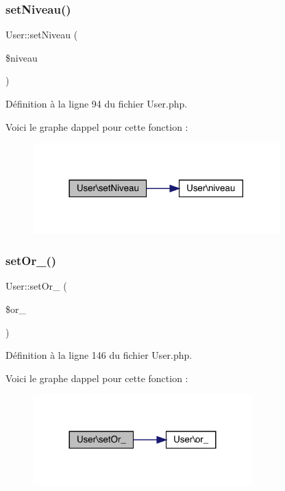 \subsubsection{\texorpdfstring{set\+Niveau()}{setNiveau()}}
{\footnotesize\ttfamily User\+::set\+Niveau (\begin{DoxyParamCaption}\item[{}]{\$niveau }\end{DoxyParamCaption})}



Définition à la ligne 94 du fichier User.\+php.

Voici le graphe d\textquotesingle{}appel pour cette fonction \+:\nopagebreak
\begin{figure}[H]
\begin{center}
\leavevmode
\includegraphics[width=270pt]{class_user_a84973efb146fe894e77bee5fe3b08f75_cgraph}
\end{center}
\end{figure}
\mbox{\label{class_user_ac5dfa43083d232944fa37624d190092e}} 
\subsubsection{\texorpdfstring{set\+Or\+\_\+()}{setOr\_()}}
{\footnotesize\ttfamily User\+::set\+Or\+\_\+ (\begin{DoxyParamCaption}\item[{}]{\$or\+\_\+ }\end{DoxyParamCaption})}



Définition à la ligne 146 du fichier User.\+php.

Voici le graphe d\textquotesingle{}appel pour cette fonction \+:\nopagebreak
\begin{figure}[H]
\begin{center}
\leavevmode
\includegraphics[width=240pt]{class_user_ac5dfa43083d232944fa37624d190092e_cgraph}
\end{center}
\end{figure}
\mbox{\label{class_user_afa0f13589eb9cdaca9a8192d245fd75f}} 
